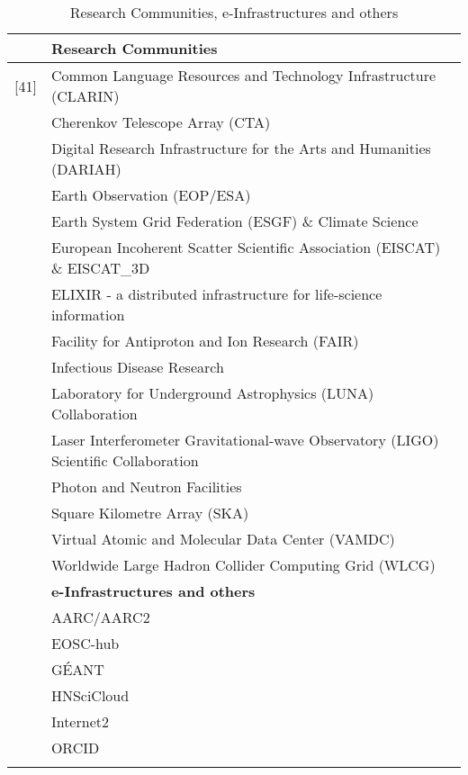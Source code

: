 \newpage
\begin{center}
\begin{longtable}{|p{0.8cm}|p{12.0cm}|} 
\hline

&\textbf{Research Communities}\\
\hline\hline
\endhead

[41] & Common Language Resources and Technology Infrastructure (CLARIN)\\
\hline
[42] & Cherenkov Telescope Array (CTA)\\
\hline
[43] & Digital Research Infrastructure for the Arts and Humanities (DARIAH)\\
\hline
[44] & Earth Observation (EOP/ESA)\\
\hline
[45] & Earth System Grid Federation (ESGF) \& Climate Science\\
\hline
[46] & European Incoherent Scatter Scientific Association (EISCAT) \& EISCAT\_3D\\
\hline
[47] & ELIXIR - a distributed infrastructure for life-science information\\
\hline
[48] & Facility for Antiproton and Ion Research (FAIR)\\
\hline
[49] & Infectious Disease Research\\
\hline
[50] & Laboratory for Underground Astrophysics (LUNA) Collaboration\\
\hline
[51] & Laser Interferometer Gravitational-wave Observatory (LIGO) Scientific Collaboration\\
\hline
[52] & Photon and Neutron Facilities\\
\hline
[53] & Square Kilometre Array  (SKA)\\
\hline
[54] & Virtual Atomic and Molecular Data Center (VAMDC)\\
\hline
[55] & Worldwide Large Hadron Collider Computing Grid (WLCG)\\
\hline

\hline
&\textbf{e-Infrastructures and others}\\
\hline
[71] & AARC/AARC2\\
\hline
[72] & EOSC-hub\\
\hline
[73] & GÉANT\\
\hline
[74] & HNSciCloud\\
\hline
[75] & Internet2\\
\hline
[76] & ORCID\\
\hline

\hline                                           
\caption{Research Communities, e-Infrastructures and others}
\label{tab:matrix}
\end{longtable}
\end{center}

